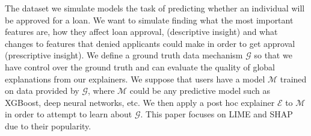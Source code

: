 \documentclass[11pt]{article}    %
\begin{document}
The dataset we simulate models the task of predicting whether an individual will be approved for a loan. %
We want to simulate finding what the most important features are, how they affect loan approval, (descriptive insight) and what changes to features that denied applicants could make in order to get approval (prescriptive insight).  %
We define a ground truth data mechanism  $\mathcal{G}$  so that we have control over the ground truth and can evaluate the quality of global explanations from our explainers. We suppose that users have a model $\mathcal{M}$ trained on data provided by $\mathcal{G}$, where $\mathcal{M}$ could be any predictive model such as XGBoost, deep neural networks, etc. We then apply a post hoc explainer $\mathcal{E}$ to $\mathcal{M}$ in order to attempt to learn about $\mathcal{G}$.
 This paper focuses on LIME and SHAP due to their popularity.
 
\end{document}

